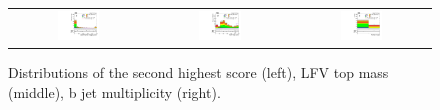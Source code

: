 \begin{figure}[tbh!]
 \begin{center}
 \begin{tabular}{ccc}
  \includegraphics[width=0.325\textwidth]{figures/Appendix/SRMC/Jet2Btag}&
  \includegraphics[width=0.325\textwidth]{figures/Appendix/SRMC/LFVTopmass}&
  \includegraphics[width=0.325\textwidth]{figures/Appendix/SRMC/nbjet}\\
 \end{tabular}
 \caption{Distributions of the second highest \DeepJ score (left), LFV top mass (middle), b jet multiplicity (right).}
 \label{fig:input_vali_2}
 \end{center}
\end{figure}

